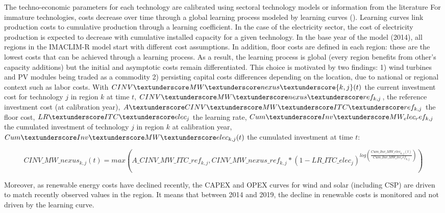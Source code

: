 The techno-economic parameters for each technology are calibrated using sectoral technology models or information from the literature %
For immature technologies, costs decrease over time through a global learning process modeled by learning curves (\cite{Neij2008}). Learning curves link production costs to cumulative production through a learning coefficient. In the case of the electricity sector, the cost of electricity production is expected to decrease with cumulative installed capacity for a given technology. In the base year of the model (2014), all regions in the IMACLIM-R model start with different cost assumptions. In addition, floor costs are defined in each region: these are the lowest costs that can be achieved through a learning process. As a result, the learning process is global (every region benefits from other's capacity additions) but the initial and asymptotic costs remain differentiated. This choice is motivated by two findings: 1) wind turbines and PV modules being traded as a commodity 2) persisting capital costs differences depending on the location, due to national or regional context such as labor costs. With $CINV \textunderscore MW\textunderscore nexus\textunderscore {k,j}(t)$ the current investment cost for technology $j$ in region $k$ at time $t$, $CINV\textunderscore MW\textunderscore nexus \textunderscore ref_{k,j}$, the reference investment cost (at calibration year), $A\textunderscore CINV\textunderscore MW\textunderscore ITC\textunderscore ref_{k,j}$ the floor cost,  $LR\textunderscore ITC\textunderscore elec_{j}$ the learning rate, $Cum\textunderscore Inv\textunderscore MW_ elec_ ref_{k,j}$ the cumulated investment of technology $j$ in region $k$ at calibration year, $Cum\textunderscore Inv\textunderscore MW\textunderscore elec_{k,j}(t)$ the cumulated investment at time $t$:

\begin{dmath}
    CINV\_MW\_nexus_{k,j}(t) = max(A\_CINV\_MW\_ITC\_ref_{k,j},CINV\_MW\_nexus \_ref_{k,j}*(1-LR\_ ITC\_elec_{j})^{log(\frac{Cum\_Inv\_MW\_elec_{k,j}(t)}{Cum\_Inv\_MW_elec_ ref_{k,j}})})
    \label{eqn:LR}
\end{dmath}

Moreover, as renewable energy costs have declined recently, the CAPEX and OPEX curves for wind and solar (including CSP) are driven to match recently observed values in the region. It means that between 2014 and 2019, the decline in renewable costs is monitored and not driven by the learning curve.

